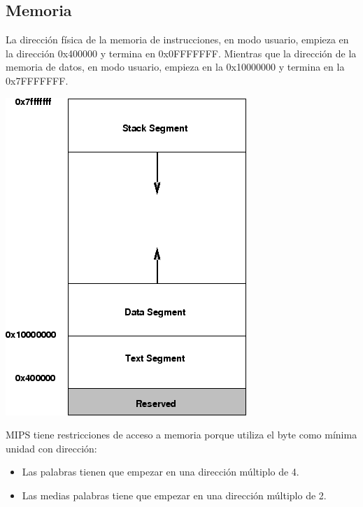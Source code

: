 \documentclass[12pt]{article}
\begin{document}
\subsection{Memoria}
La dirección física de la memoria de instrucciones, en modo usuario, empieza en la dirección 0x400000 y termina en 0x0FFFFFFF. Mientras que la dirección de la memoria
de datos, en modo usuario, empieza en la 0x10000000 y termina en la 0x7FFFFFFF.
\begin{center}
\includegraphics[height=\dimexpr\pagegoal-\pagetotal-\baselineskip\relax,width=\textwidth,keepaspectratio]{gmemory.png}
\end{center}
MIPS tiene restricciones de acceso a memoria porque utiliza el byte como mínima unidad con dirección:
\begin{itemize}
\item Las palabras tienen que empezar en una dirección múltiplo de 4.
\item Las medias palabras tiene que empezar en una dirección múltiplo de 2.
\end{itemize}
\end{document}
